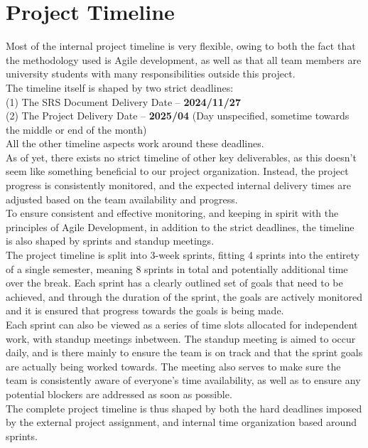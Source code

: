 \section{Project Timeline}

Most of the internal project timeline is very flexible, owing to both the fact that the methodology used is Agile development, 
as well as that all team members are university students with many responsibilities outside this project. \\

The timeline itself is shaped by two strict deadlines: \\
(1) The SRS Document Delivery Date -- \textbf{2024/11/27} \\
(2) The Project Delivery Date -- \textbf{2025/04} (Day unspecified, sometime towards the middle or end of the month) \\

All the other timeline aspects work around these deadlines. \\

As of yet, there exists no strict timeline of other key deliverables, as this doesn't seem like something beneficial to our project organization.
Instead, the project progress is consistently monitored, and the expected internal delivery times are adjusted based on the team availability and progress. \\

To ensure consistent and effective monitoring, and keeping in spirit with the principles of Agile Development, in addition to the strict deadlines, the timeline is also shaped by sprints and standup meetings. \\

The project timeline is split into 3-week sprints, fitting 4 sprints into the entirety of a single semester, meaning 8 sprints in total and potentially additional time over the break.
Each sprint has a clearly outlined set of goals that need to be achieved, and through the duration of the sprint, the goals are actively monitored and it is ensured that progress towards the goals is being made. \\

Each sprint can also be viewed as a series of time slots allocated for independent work, with standup meetings inbetween.
The standup meeting is aimed to occur daily, and is there mainly to ensure the team is on track and that the sprint goals are actually being worked towards.
The meeting also serves to make sure the team is consistently aware of everyone's time availability, as well as to ensure any potential blockers are addressed as soon as possible. \\

The complete project timeline is thus shaped by both the hard deadlines imposed by the external project assignment, and internal time organization based around sprints.

